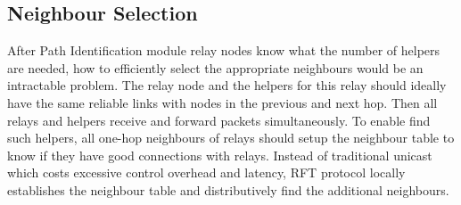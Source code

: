 \documentclass[conference]{IEEEtran}
\begin{document}
%

\subsection{Neighbour Selection} 
\label{neighbourselection}
After Path Identification module relay nodes know what the number of helpers are needed, how to efficiently select the appropriate neighbours would be an intractable problem. The relay node and the helpers for this relay should ideally have the same reliable links with nodes in the previous and next hop. Then all relays and helpers receive and forward packets simultaneously. To enable find such helpers, all one-hop neighbours of relays should setup the neighbour table to know if they have good connections with relays. Instead of traditional unicast which costs excessive control overhead and latency, RFT protocol locally establishes the neighbour table and distributively find the additional neighbours.
\end{document}
